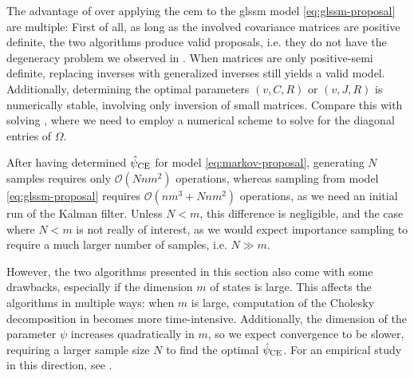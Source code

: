 The advantage of  over applying the \gls{cem} to the \gls{glssm} model \eqref{eq:glssm-proposal} are multiple: First of all, as long as the involved covariance matrices are positive definite, the two algorithms produce valid proposals, i.e. they do not have the degeneracy problem we observed in . When matrices are only positive-semi definite, replacing inverses with generalized inverses still yields a valid model.
Additionally, determining the optimal parameters $(v, C,R)$ or $(v,J,R)$ is numerically stable, involving only inversion of small matrices. Compare this with solving , where we need to employ a numerical scheme to solve for the diagonal entries of $\Omega$.

After having determined ${\hat\psi_{\text{CE}}}$ for model \eqref{eq:markov-proposal}, generating $N$ samples requires only $\mathcal O(Nnm^{2})$ operations, whereas sampling from model \eqref{eq:glssm-proposal} requires $\mathcal O(nm^{3} + Nnm^{2})$ operations, as we need an initial run of the Kalman filter. Unless $N < m$, this difference is negligible, and the case where $N < m$ is not really of interest, as we would expect importance sampling to require a much larger number of samples, i.e. $N \gg m$. 

However, the two algorithms presented in this section also come with some drawbacks, especially if the dimension $m$ of states is large. This affects the algorithms in multiple ways: when $m$ is large, computation of the Cholesky decomposition in  becomes more time-intensive. Additionally, the dimension of the parameter $\psi$ increases quadratically in $m$, so we expect convergence to be slower, requiring a larger sample size $N$ to find the optimal ${\hat\psi_{\text{CE}}}$. For an empirical study in this direction, see .




